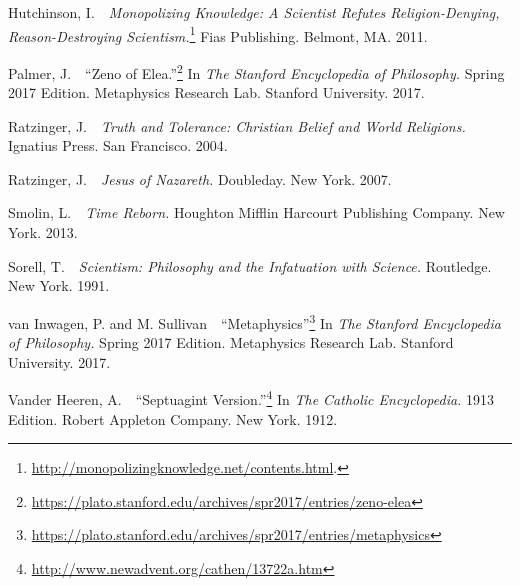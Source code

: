 \documentclass[twocolumn]{article}
\begin{document}
\begin{thebibliography}{}
\begin{small}
      Hutchinson, I.\ \ {\it Monopolizing Knowledge: A Scientist Refutes
      Religion-Denying, Reason-Destroying Scientism.}\footnote{%
         \url{http://monopolizingknowledge.net/contents.html}.%
      }
      Fias Publishing.  Belmont, MA.  2011.

      Palmer, J.\ \ ``Zeno of Elea.''\footnote{%
         \url{https://plato.stanford.edu/archives/spr2017/entries/zeno-elea}%
      }
      In {\it The Stanford Encyclopedia of Philosophy.}  Spring 2017 Edition.
      Metaphysics Research Lab.  Stanford University.  2017.

      Ratzinger, J.\ \ {\it Truth and Tolerance: Christian Belief and World
      Religions.}  Ignatius Press.  San Francisco.  2004.

      Ratzinger, J.\ \ {\it Jesus of Nazareth.}  Doubleday.  New York.  2007.

      Smolin, L.\ \ {\it Time Reborn.}  Houghton Mifflin Harcourt Publishing
      Company.  New York.  2013.

      Sorell, T.\ \ {\it Scientism: Philosophy and the Infatuation with
      Science.}  Routledge.  New York.  1991.

      van Inwagen, P. and M. Sullivan\ \ ``Metaphysics''\footnote{%
         \url{https://plato.stanford.edu/archives/spr2017/entries/metaphysics}%
      }
      In {\it The Stanford Encyclopedia of Philosophy.}  Spring 2017 Edition.
      Metaphysics Research Lab.  Stanford University.  2017.

      Vander Heeren, A.\ \ ``Septuagint Version.''\footnote{%
         \url{http://www.newadvent.org/cathen/13722a.htm}%
      }
      In {\it The Catholic Encyclopedia.}  1913 Edition.  Robert Appleton
      Company.  New York.  1912.

   \end{small}

\end{thebibliography}


\end{document}
